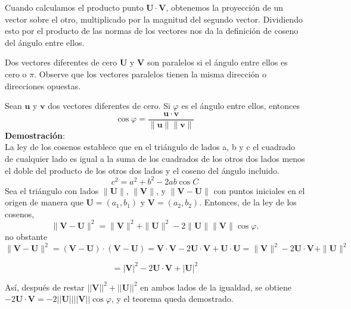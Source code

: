 \begin{remark}
Cuando calculamos el producto punto 
$\boldsymbol{U\cdot V}$, obtenemos la proyección de un vector sobre el otro, multiplicado por la magnitud del segundo vector. Dividiendo esto por el producto de las normas de los vectores nos da la definición de coseno del ángulo entre ellos.
\end{remark}
\begin{definition}
    Dos vectores diferentes de cero $\boldsymbol{U}$ y $\boldsymbol{V}$ son paralelos si el ángulo entre ellos es cero o $\pi$. 
Observe que los vectores paralelos tienen la misma dirección o direcciones opuestas.
\end{definition}
\begin{tcolorbox}[colback=white!5!white,colframe=red!50!red,title=Teorema]
Sean $\mathbf{u}$ y $\mathbf{v}$ dos vectores diferentes de cero. Si $\varphi$ es el ángulo entre ellos, entonces
\[
\cos \varphi
= \frac{\mathbf{u} \cdot \mathbf{v}}{\|\mathbf{u}\| \|\mathbf{v}\|}
\]
\textbf{Demostración}:\\
La ley de los cosenos establece que en el triángulo de lados a, b y c el cuadrado de cualquier lado  es igual a la suma de los cuadrados de los otros dos lados menos el doble del producto de los otros dos lados y el coseno del ángulo incluido.$$c^2 = a^2 + b^2 - 2ab \cos C$$
Sea el triángulo con lados $\|\mathbf{U}\|$, $\|\mathbf{V}\|$, y $\|\mathbf{V} -\mathbf{U}\|$ con  puntos iniciales en el origen de manera que $\mathbf{U} = (a_1, b_1)$ y $\mathbf{V} = (a_2, b_2)$. Entonces, de la ley de los cosenos,
$$
\|\mathbf{V} - \mathbf{U}\|^2 = \|\mathbf{V}\|^2 + \|\mathbf{U}\|^2 - 2\|\mathbf{U}\|\|\mathbf{V}\|\cos \varphi.
$$
no obstante \[
\|\mathbf{V} - \mathbf{U}\|^2 = (\mathbf{V} - \mathbf{U}) \cdot (\mathbf{V} - \mathbf{U}) = \mathbf{V} \cdot \mathbf{V} - 2\mathbf{U} \cdot \mathbf{V} + \mathbf{U} \cdot \mathbf{U} = \|\mathbf{V}\|^2 - 2\mathbf{U} \cdot \mathbf{V} + \|\mathbf{U}\|^2
\]

\[ = |\mathbf{V}|^2 - 2\mathbf{U} \cdot \mathbf{V} + |\mathbf{U}|^2 \]

Así, después de restar \(||\mathbf{V}||^2 + ||\mathbf{U}||^2\) en ambos lados de la igualdad, se obtiene \(-2\mathbf{U} \cdot \mathbf{V} = -2||\mathbf{U}|| ||\mathbf{V}|| \cos \varphi\), y el teorema queda demostrado.
\end{tcolorbox}
